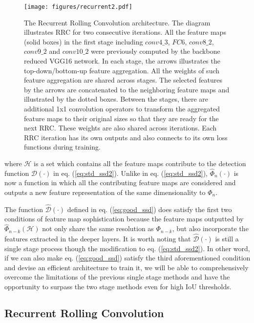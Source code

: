 \documentclass[10pt,twocolumn,letterpaper]{article}
\begin{document}
\begin{figure*}[ht]
\begin{center}
\centerline{\texttt{[image: figures/recurrent2.pdf]}}
\caption{The Recurrent Rolling Convolution architecture. The diagram illustrates RRC for two consecutive iterations. All the feature maps (solid boxes) in the first stage including $conv4\_3$, $FC6$, $conv8\_2$, $conv9\_2$ and $conv10\_2$ were previously computed by the backbone reduced VGG16 network. In each stage, the arrows illustrates the top-down/bottom-up feature aggregation. All the weights of such feature aggregation are shared across stages. The selected features by the arrows are concatenated to the neighboring feature maps and illustrated by the dotted boxes. Between the stages, there are additional 1x1 convolution operators to transform the aggregated feature maps to their original sizes so that they are ready for the next RRC. These weights are also shared across iterations. Each RRC iteration has its own outputs and also connects to its own loss functions during training.}
\label{fig:rrc}
\end{center}
\vskip -0.2in
\end{figure*} 

\noindent where $\mathcal{H}$ is a set which contains all the feature maps contribute to the detection function $\mathcal{D}(\cdot)$ in eq. (\ref{eq:std_ssd2}). Unlike in eq. (\ref{eq:std_ssd2}), $\hat{\Phi}_n(\cdot)$ is now a function in which all the contributing feature maps are considered and outputs a new feature representation of the same dimensionality to $\Phi_n$.

The function $\mathcal{\hat{D}}(\cdot)$ defined in eq. (\ref{eq:good_ssd}) does satisfy the first two conditions of feature map sophistication because the feature maps outputted by $\hat{\Phi}_{n-k}(\mathcal{H})$ not only share the same resolution as $\Phi_{n-k}$, but also incorporate the features extracted in the deeper layers. It is worth noting that $\mathcal{\hat{D}}(\cdot)$ is still a single stage process though the modification to eq. (\ref{eq:std_ssd2}). In other word, if we can also make eq. (\ref{eq:good_ssd}) satisfy the third aforementioned condition and devise an efficient architecture to train it, we will be able to comprehensively overcome the limitations of the previous single stage methods and have the opportunity to surpass the two stage methods even for high IoU thresholds.

\subsection{Recurrent Rolling Convolution}
\end{document}
